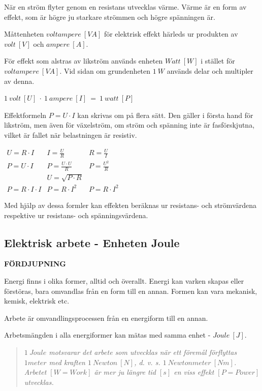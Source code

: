 När en ström flyter genom en resistans utvecklas värme. Värme är en form av
effekt, som är högre ju starkare strömmen och högre spänningen är.

Måttenheten \(voltampere\ [VA]\) för elektrisk effekt härleds ur produkten av
\(volt\ [V]\) och \(ampere\ [A]\).

För effekt som alstras av likström används enheten \(Watt\ [W]\) i stället för
\(voltampere\ [VA]\). Vid sidan om grundenheten \(1\ W\) används delar och
multipler av denna.

\(1\ volt\ [U]\ \cdot\ 1\ ampere\ [I]\ =\ 1\ watt\ [P]\)

Effektformeln \(P = U \cdot I\) kan skrivas om på flera sätt. Den gäller i första
hand för likström, men även för växelström, om ström och spänning inte är
fasförskjutna, vilket är fallet när belastningen är resistiv.

\(
\begin{array}{lll}
U = R \cdot I & I = \frac{U}{R} & R = \frac{U}{I} \\
P = U \cdot I & P = \frac{U \cdot U }{R} & P = \frac{U^2}{R} \\
&U = \sqrt{P \cdot R} & \\
P = R \cdot I \cdot I & P = R \cdot I^2 & P = R \cdot I^2
\end{array}
\)

Med hjälp av dessa formler kan effekten beräknas ur resistans- och strömvärdena
respektive ur resistans- och spänningsvärdena.

\subsection{Elektrisk arbete - Enheten Joule}
\textbf{FÖRDJUPNING}

Energi finns i olika former, alltid och överallt. Energi kan varken skapas
eller förstöras, bara omvandlas från en form till en annan. Formen kan vara
mekanisk, kemisk, elektrisk etc.

Arbete är omvandlingsprocessen från en energiform till en annan.

Arbetsmängden i alla energiformer kan mätas med samma enhet - \(Joule\ [J]\).

\begin{quote}\emph{
\(1\ Joule\) motsvarar det arbete som utvecklas när ett föremål förflyttas
\(1 meter\) med kraften \(1\ Newton\ [N]\), d. v. s. \(1\ Newtonmeter\ [Nm]\).
Arbetet \([W=Work]\) är mer ju längre tid \([s]\) en viss effekt \([P=Power]\)
utvecklas.
}\end{quote}

